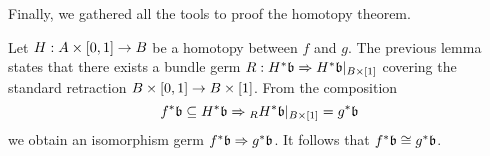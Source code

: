 \begin{scope}
\begin{myparagraph}
    Finally, we gathered all the tools to proof the homotopy theorem.
\end{myparagraph}
\begin{myproof}
Let $H: A \times [0, 1] \to B$ be a homotopy between $f$ and $g$.
The previous lemma states that there exists a bundle germ $R: H^*\mathfrak{b} \Rightarrow{} H^*\mathfrak{b}\vert_{B \times [1]}$ covering the standard retraction $B \times [0, 1] \to B \times [1]$.
From the composition
\[ f^*\mathfrak{b} \subseteq{} H^*\mathfrak{b} \Rightarrow{}_R H^*\mathfrak{b}\vert_{B \times [1]} = g^*\mathfrak{b} \]
we obtain an isomorphism germ $f^*\mathfrak{b} \Rightarrow{} g^*\mathfrak{b}$.
It follows that $f^*\mathfrak{b} \cong g^*\mathfrak{b}$.
\end{myproof}

\end{scope}